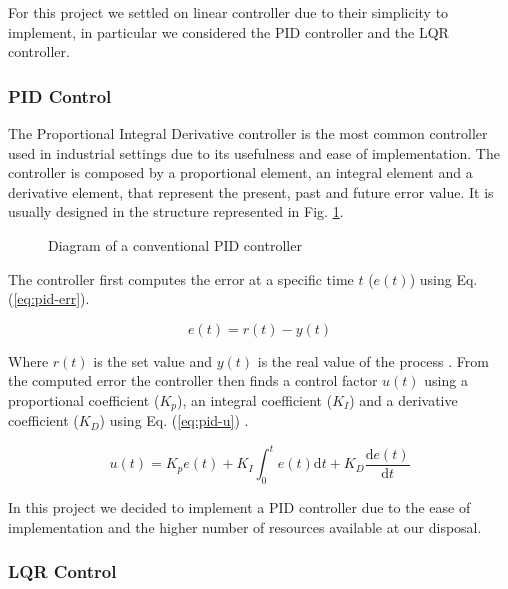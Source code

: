 For this project we settled on linear controller due to their simplicity to implement, in particular
we considered the PID controller and the LQR controller.

\subsubsection{PID Control}

The Proportional Integral Derivative controller is the most common controller used in industrial settings
due to its usefulness and ease of implementation. \autocite{IL23} The controller is composed by a proportional
element, an integral element and a derivative element, that represent the present, past and future error value\autocite{AM09}. 
It is usually designed in the structure represented in Fig. \ref{fig:pid}.

\begin{figure}
	\begin{center}
		
	\end{center}
	\caption{Diagram of a conventional PID controller}\label{fig:pid}
\end{figure}

The controller first computes the error at a specific time $t$ ($e(t)$) using Eq. (\ref{eq:pid-err}).

\begin{equation}
	e(t) = r(t) - y(t)
	\label{eq:pid-err}
\end{equation}

Where $r(t)$ is the set value and $y(t)$ is the real value of the process \autocite{AM09}. 
From the computed error the controller then finds a control factor $u(t)$ using a proportional
coefficient ($K_p$), an integral coefficient ($K_I$) and a derivative coefficient ($K_D$) 
using Eq. (\ref{eq:pid-u}) \autocite{NH20}.

\begin{equation}
	u(t) = K_p e(t) + K_I \int^t_0 e(t) \mathrm{d} t + K_D \frac{\mathrm{d} e(t)}{\mathrm{d}t}
	\label{eq:pid-u}
\end{equation}

In this project we decided to implement a PID controller due to the ease of implementation and the 
higher number of resources available at our disposal.

\subsubsection{LQR Control}

